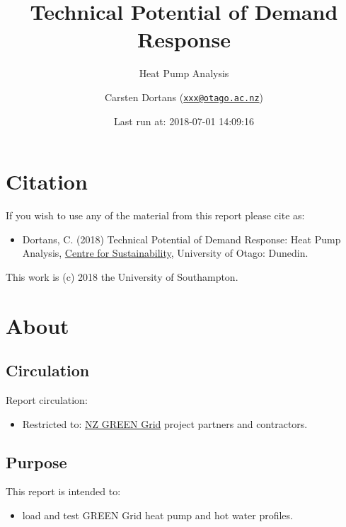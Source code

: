 \documentclass[]{article}
\title{Technical Potential of Demand Response}
\subtitle{Heat Pump Analysis}
\author{Carsten Dortans
(\href{mailto:xxx@otago.ac.nz}{\nolinkurl{xxx@otago.ac.nz}})}
\date{Last run at: 2018-07-01 14:09:16}
\providecommand{\tightlist}{%
  \setlength{\itemsep}{0pt}\setlength{\parskip}{0pt}}
\theoremstyle{definition}
\theoremstyle{definition}
\theoremstyle{definition}
\theoremstyle{remark}
\begin{document}
\maketitle

{
\setcounter{tocdepth}{2}
\tableofcontents
}
\newpage

\section{Citation}\label{citation}

If you wish to use any of the material from this report please cite as:

\begin{itemize}
\tightlist
\item
  Dortans, C. (2018) Technical Potential of Demand Response: Heat Pump
  Analysis, \href{http://www.otago.ac.nz/centre-sustainability/}{Centre
  for Sustainability}, University of Otago: Dunedin.
\end{itemize}

This work is (c) 2018 the University of Southampton.

\newpage

\section{About}\label{about}

\subsection{Circulation}\label{circulation}

Report circulation:

\begin{itemize}
\tightlist
\item
  Restricted to:
  \href{https://www.otago.ac.nz/centre-sustainability/research/energy/otago050285.html}{NZ
  GREEN Grid} project partners and contractors.
\end{itemize}

\subsection{Purpose}\label{purpose}

This report is intended to:

\begin{itemize}
\tightlist
\item
  load and test GREEN Grid heat pump and hot water profiles.
\end{itemize}
\end{document}
